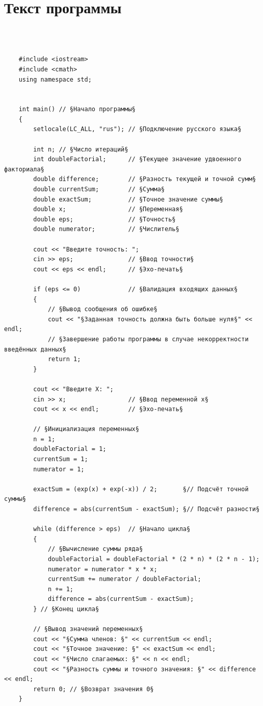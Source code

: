 \documentclass[a4paper]{article}
\begin{document}
	\newpage
	
	\section{Текст программы}
	
	\
	\begin{lstlisting}[style={CppCodeStyle}]
	
	#include <iostream>
	#include <cmath>
	using namespace std;
	
	
	int main() // §Начало программы§
	{
		setlocale(LC_ALL, "rus"); // §Подключение русского языка§
		
		int n; // §Число итераций§
		int doubleFactorial;      // §Текущее значение удвоенного факториала§
		double difference;        // §Разность текущей и точной сумм§
		double currentSum;        // §Сумма§
		double exactSum;          // §Точное значение суммы§
		double x;                 // §Переменная§
		double eps;               // §Точность§
		double numerator;         // §Числитель§
		
		cout << "Введите точность: ";
		cin >> eps;               // §Ввод точности§
		cout << eps << endl;      // §Эхо-печать§
		
		if (eps <= 0)             // §Валидация входящих данных§
		{
			// §Вывод сообщения об ошибке§
			cout << "§Заданная точность должна быть больше нуля§" << endl; 
			// §Завершение работы программы в случае некорректности введённых данных§
			return 1;
		}
		
		cout << "Введите X: ";
		cin >> x;                 // §Ввод переменной x§
		cout << x << endl;        // §Эхо-печать§
		
		// §Инициализация переменных§
		n = 1;
		doubleFactorial = 1;
		currentSum = 1;
		numerator = 1;
		
		exactSum = (exp(x) + exp(-x)) / 2;       §// Подсчёт точной суммы§
		difference = abs(currentSum - exactSum); §// Подсчёт разности§
		
		while (difference > eps)  // §Начало цикла§
		{
			// §Вычисление суммы ряда§
			doubleFactorial = doubleFactorial * (2 * n) * (2 * n - 1);
			numerator = numerator * x * x;
			currentSum += numerator / doubleFactorial;
			n += 1;
			difference = abs(currentSum - exactSum);
		} // §Конец цикла§
		
		// §Вывод значений переменных§
		cout << "§Сумма членов: §" << currentSum << endl;
		cout << "§Точное значение: §" << exactSum << endl;
		cout << "§Число слагаемых: §" << n << endl;
		cout << "§Разность суммы и точного значения: §" << difference << endl;
		return 0; // §Возврат значения 0§
	}
	
	\end{lstlisting}
	\newpage
	
\end{document}
